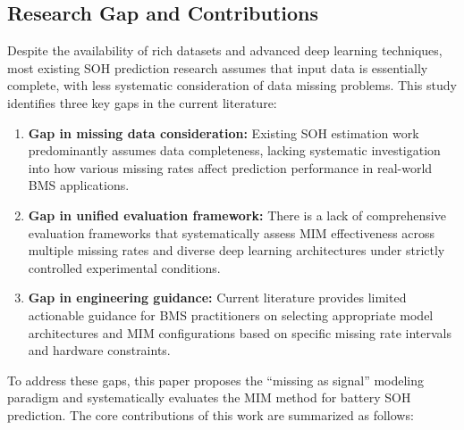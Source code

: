 \documentclass[5p,times]{elsarticle}
\begin{document}
\subsection{Research Gap and Contributions}\label{sec:contributions}

Despite the availability of rich datasets and advanced deep learning techniques, most existing SOH prediction research assumes that input data is essentially complete, with less systematic consideration of data missing problems\cite{shao2025soh,deng2025novel,chen2024batteryMissing}. This study identifies three key gaps in the current literature:

\begin{enumerate}
    \item \textbf{Gap in missing data consideration:} Existing SOH estimation work predominantly assumes data completeness, lacking systematic investigation into how various missing rates affect prediction performance in real-world BMS applications.
    
    \item \textbf{Gap in unified evaluation framework:} There is a lack of comprehensive evaluation frameworks that systematically assess MIM effectiveness across multiple missing rates and diverse deep learning architectures under strictly controlled experimental conditions.
    
    \item \textbf{Gap in engineering guidance:} Current literature provides limited actionable guidance for BMS practitioners on selecting appropriate model architectures and MIM configurations based on specific missing rate intervals and hardware constraints.
\end{enumerate}

To address these gaps, this paper proposes the ``missing as signal'' modeling paradigm and systematically evaluates the MIM method for battery SOH prediction. The core contributions of this work are summarized as follows:
\end{document}
